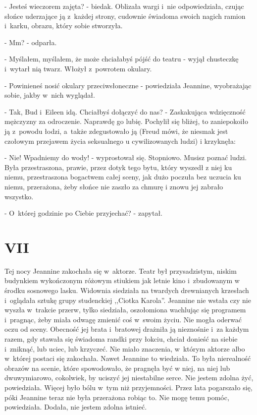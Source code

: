 \documentclass[oneside,polish,12pt,sfheadings]{mwbk}
\begin{document}
- Jesteś wieczorem zajęta? - biedak. Oblizała wargi i~nie odpowiedziała,
czując słońce uderzające ją z~każdej strony, cudownie świadoma swoich
nagich ramion i~karku, obrazu, który sobie stworzyła. 

- Mm? - odparła.

- Myślałem, myślałem, że może chciałabyś pójść do teatru - wyjął chusteczkę
i~wytarł nią twarz. Włożył z~powrotem okulary.

- Powinieneś nosić okulary przeciwsłoneczne - powiedziała Jeannine,
wyobrażając sobie, jakby w~nich wyglądał. 

- Tak, Bud i~Eileen idą. Chciałbyś dołączyć do nas? - Zaskakująca wdzięczność mężczyzny za
odroczenie. Naprawdę go lubię. Pochylił się bliżej, to zaniepokoiło
ją z~powodu łodzi, a~także zdegustowało ją (Freud mówi, że niesmak
jest czołowym przejawem życia seksualnego u cywilizowanych ludzi)
i krzyknęła: 

- Nie! Wpadniemy do wody! - wyprostował się. Stopniowo. Musisz poznać ludzi.
Była przestraszona, prawie, przez dotyk tego bytu, który wyszedł z
niej ku niemu, przestraszona bogactwem całej sceny, jak dużo poczuła
bez uczucia ku niemu, przerażona, żeby słońce nie zaszło za chmurę
i znowu jej zabrało wszystko.

- O~której godzinie po Ciebie przyjechać? - zapytał.

\chapter{VII}

Tej nocy Jeannine zakochała się w~aktorze. Teatr był przysadzistym,
niskim budynkiem wykończonym różowym stiukiem jak letnie kino i~zbudowanym
w środku sosnowego lasku. Widownia siedziała na twardych drewnianych
krzesłach i~oglądała sztukę grupy studenckiej ,,Ciotka Karola''. Jeannine
nie wstała czy nie wyszła w~trakcie przerw, tylko siedziała, oszołomiona
wachlując się programem i~pragnąc, żeby miała odwagę zmienić coś w~swoim życiu. Nie mogła oderwać oczu od sceny. Obecność jej brata i~bratowej drażniła ją nieznośnie i~za każdym razem, gdy stawała się
świadoma randki przy łokciu, chciał donieść na siebie i~zniknąć, lub
uciec, lub krzyczeć. Nie miało znaczenia, w~którym aktorze albo w~której postaci się zakochała. Nawet Jeannine to wiedziała. To była
nierealność obrazów na scenie, które spowodowało, że pragnęła być
w niej, na niej lub dwuwymiarowo, cokolwiek, by uciszyć jej niestabilne
serce. Nie jestem zdolna żyć, powiedziała. Więcej było bólu w~tym
niż przyjemności. Przez lata pogarszało się, póki Jeannine teraz nie
była przerażona robiąc to. Nie mogę temu pomóc, powiedziała. Dodała,
nie jestem zdolna istnieć.
\end{document}
